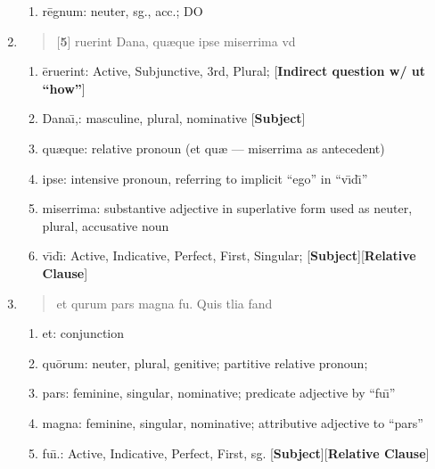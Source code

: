 \documentclass[]{article}
\newcommand{\latify}[1]{
        \Large
        \begin{verse}
          \begin{metrica}
          {#1}\\
          \end{metrica}
        \end{verse}
        \normalsize
}
\begin{document}
\begin{enumerate}
\begin{enumerate}
	\item r\={e}gnum:  neuter, sg., acc.; DO

\end{enumerate}


\item \latify{[\textbf{5}] {}ruerint Dana{\macron {\i}}, qu{\ae}que ipse miserrima v{\macron {\i}}d{\macron {\i}}}
\begin{enumerate}

	\item \={e}ruerint:  Active, Subjunctive, 3rd, Plural; [\textbf{Indirect question w/ ut ``how''}]
                                                                    
	\item Dana\={\i},:  masculine, plural, nominative [\textbf{Subject}]

	\item qu{\ae}que: relative pronoun (et qu{\ae} --- miserrima as antecedent)

	\item ipse:  intensive pronoun, referring to implicit ``ego'' in ``v\={\i}d\={\i}''

	\item miserrima:  substantive adjective in superlative form used as neuter, plural, accusative noun

	\item v\={\i}d\={\i}: Active, Indicative, Perfect, First, Singular;  [\textbf{Subject}][\textbf{Relative Clause}]

\end{enumerate}

\item \latify{et qu{}rum pars magna fu{\macron {\i}}.  Quis t{\macron {a}}lia fand{\macron {o}}}
\begin{enumerate}

	\item et:  conjunction

	\item qu\={o}rum: neuter, plural, genitive; partitive relative pronoun; 

	\item pars:  feminine, singular, nominative; predicate adjective by ``fu\={\i}''

	\item magna: feminine, singular, nominative; attributive adjective to ``pars''

	\item fu\={\i}.: Active, Indicative, Perfect, First, sg.  [\textbf{Subject}][\textbf{Relative Clause}]


\end{enumerate}
\end{enumerate}
\end{document}
